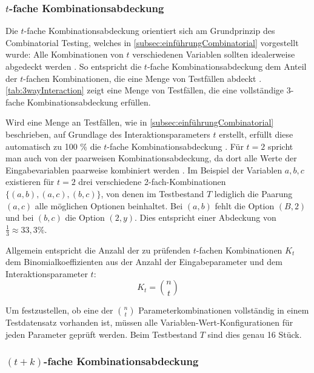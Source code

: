 \subsubsection{$t$-fache Kombinationsabdeckung}\label{subsub:TAbdeckung}

Die $t$-fache Kombinationsabdeckung orientiert sich am Grundprinzip des Combinatorial Testing, welches in \autoref{subsec:einführungCombinatorial} vorgestellt wurde: Alle Kombinationen von $t$ verschiedenen Variablen sollten idealerweise abgedeckt werden \cite{kuhn2010practical}. So entspricht die $t$-fache Kombinationsabdeckung dem Anteil der $t$-fachen Kombinationen, die eine Menge von Testfällen abdeckt \cite{kuhn2010practical}. \autoref{tab:3wayInteraction} zeigt eine Menge von Testfällen, die eine vollständige 3-fache Kombinationsabdeckung erfüllen.
 
Wird eine Menge an Testfällen, wie in \autoref{subsec:einführungCombinatorial} beschrieben, auf Grundlage des Interaktionsparameters $t$ erstellt, erfüllt diese automatisch zu 100 \% die $t$-fache Kombinationsabdeckung \cite{kuhn2010practical}. Für $t = 2$ spricht man auch von der paarweisen Kombinationsabdeckung, da dort alle Werte der Eingabevariablen paarweise kombiniert werden \cite{kuhn2010practical}. Im Beispiel der Variablen $a,b,c$ existieren für $t = 2$ drei verschiedene 2-fach-Kombinationen $\{(a,b), (a,c), (b,c)\}$, von denen im Testbestand $T$ lediglich die Paarung $(a,c)$ alle möglichen Optionen beinhaltet. Bei $(a,b)$ fehlt die Option $(B,2)$ und bei $(b,c)$ die Option $(2,y)$. Dies entspricht einer Abdeckung von $\frac{1}{3} \approx 33,3 \%$. 

Allgemein entspricht die Anzahl der zu prüfenden $t$-fachen Kombinationen $K_t$ dem Binomialkoeffizienten aus der Anzahl der Eingabeparameter und dem Interaktionsparameter $t$:
\[
K_t = \binom{n}{t}
\]

Um festzustellen, ob eine der $\binom{n}{t}$ Parameterkombinationen vollständig in einem Testdatensatz vorhanden ist, müssen alle Variablen-Wert-Konfigurationen für jeden Parameter geprüft werden. Beim Testbestand $T$ sind dies genau 16 Stück.

\subsubsection{$(t+k)$-fache Kombinationsabdeckung}\label{subsub:tPlusKAbdeckung}

